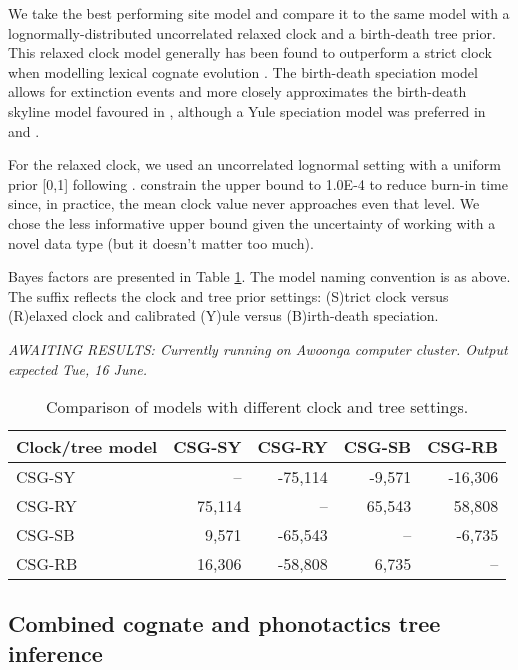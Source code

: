 \documentclass[]{article}
\begin{document}
We take the best performing site model and compare it to the same model with a lognormally-distributed uncorrelated relaxed clock and a birth-death tree prior. This relaxed clock model generally has been found to outperform a strict clock when modelling lexical cognate evolution \autocites{bouckaert_origin_2018}{kolipakam_bayesian_2018}. The birth-death speciation model allows for extinction events and more closely approximates the birth-death skyline model favoured in \textcite{bouckaert_origin_2018}, although a Yule speciation model was preferred in \textcite{bowern_computational_2012} and \textcite{kolipakam_bayesian_2018}.

For the relaxed clock, we used an uncorrelated lognormal setting with a uniform prior {[}0,1{]} following \textcite{kolipakam_bayesian_2018}. \textcite{bouckaert_origin_2018} constrain the upper bound to 1.0E-4 to reduce burn-in time since, in practice, the mean clock value never approaches even that level. We chose the less informative upper bound given the uncertainty of working with a novel data type (but it doesn't matter too much).

Bayes factors are presented in Table \ref{tab:tree-models}. The model naming convention is as above. The suffix reflects the clock and tree prior settings: (S)trict clock versus (R)elaxed clock and calibrated (Y)ule versus (B)irth-death speciation.

\emph{AWAITING RESULTS: Currently running on Awoonga computer cluster. Output expected Tue, 16 June.}

\begin{table}

\caption{\label{tab:tree-models}Comparison of models with different clock and tree settings.}
\centering
\begin{tabular}[t]{lrrrr}
\toprule
Clock/tree model & CSG-SY & CSG-RY & CSG-SB & CSG-RB\\
\midrule
CSG-SY & -- & -75,114 & -9,571 & -16,306\\
CSG-RY & 75,114 & -- & 65,543 & 58,808\\
\addlinespace
CSG-SB & 9,571 & -65,543 & -- & -6,735\\
CSG-RB & 16,306 & -58,808 & 6,735 & --\\
\bottomrule
\end{tabular}
\end{table}

\hypertarget{pn-tree-combined}{%
\subsection{Combined cognate and phonotactics tree inference}\label{pn-tree-combined}}
\end{document}
